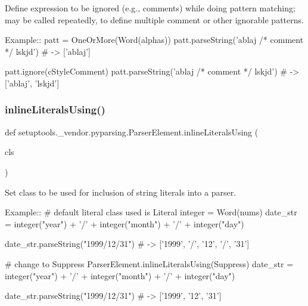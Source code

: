 \begin{DoxyVerb}Define expression to be ignored (e.g., comments) while doing pattern
matching; may be called repeatedly, to define multiple comment or other
ignorable patterns.

Example::
    patt = OneOrMore(Word(alphas))
    patt.parseString('ablaj /* comment */ lskjd') # -> ['ablaj']
    
    patt.ignore(cStyleComment)
    patt.parseString('ablaj /* comment */ lskjd') # -> ['ablaj', 'lskjd']
\end{DoxyVerb}
 \mbox{\label{classsetuptools_1_1__vendor_1_1pyparsing_1_1ParserElement_ab48c9762534971e65dbb220d20c37990}} 
\subsubsection{\texorpdfstring{inline\+Literals\+Using()}{inlineLiteralsUsing()}}
{\footnotesize\ttfamily def setuptools.\+\_\+vendor.\+pyparsing.\+Parser\+Element.\+inline\+Literals\+Using (\begin{DoxyParamCaption}\item[{}]{cls }\end{DoxyParamCaption})\hspace{0.3cm}{\ttfamily [static]}}

\begin{DoxyVerb}Set class to be used for inclusion of string literals into a parser.

Example::
    # default literal class used is Literal
    integer = Word(nums)
    date_str = integer("year") + '/' + integer("month") + '/' + integer("day")           

    date_str.parseString("1999/12/31")  # -> ['1999', '/', '12', '/', '31']


    # change to Suppress
    ParserElement.inlineLiteralsUsing(Suppress)
    date_str = integer("year") + '/' + integer("month") + '/' + integer("day")           

    date_str.parseString("1999/12/31")  # -> ['1999', '12', '31']
\end{DoxyVerb}
 \mbox{\label{classsetuptools_1_1__vendor_1_1pyparsing_1_1ParserElement_a1d04ca7a8f3273cf1e2ec1668c456145}} 
